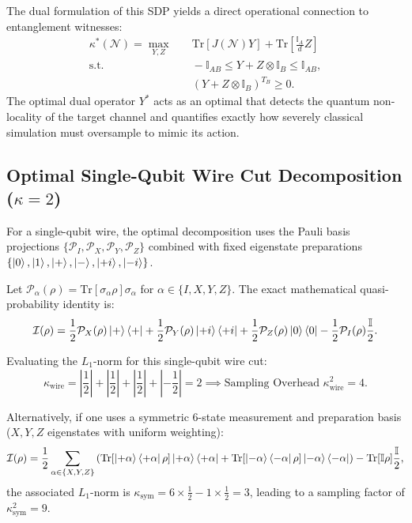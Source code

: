 The dual formulation of this SDP yields a direct operational connection to entanglement witnesses:
\begin{align}
    \kappa^*(\mathcal{N}) = \max_{Y, Z} &\quad \text{Tr}\left[ J(\mathcal{N}) Y \right] + \text{Tr}\left[ \frac{\mathbb{I}_A}{d} Z \right] \nonumber \\
    \text{s.t.} &\quad - \mathbb{I}_{AB} \le Y + Z \otimes \mathbb{I}_B \le \mathbb{I}_{AB}, \nonumber \\
    &\quad (Y + Z \otimes \mathbb{I}_B)^{T_B} \ge 0.
    \label{eq:sdp_dual_channel_cut}
\end{align}
The optimal dual operator $Y^*$ acts as an optimal  that detects the quantum non-locality of the target channel and quantifies exactly how severely classical simulation must oversample to mimic its action.

\subsection{Optimal Single-Qubit Wire Cut Decomposition (\texorpdfstring{$\kappa = 2$}{Kappa = 2})}
For a single-qubit wire, the optimal decomposition uses the Pauli basis projections $\{\mathcal{P}_I, \mathcal{P}_X, \mathcal{P}_Y, \mathcal{P}_Z\}$ combined with fixed eigenstate preparations $\{\ket{0}, \ket{1}, \ket{+}, \ket{-}, \ket{+i}, \ket{-i}\}$. 

Let $\mathcal{P}_\alpha(\rho) = \text{Tr}[\sigma_\alpha \rho] \sigma_\alpha$ for $\alpha \in \{I, X, Y, Z\}$. The exact mathematical quasi-probability identity is:
\begin{equation}
    \mathcal{I}(\rho) = \frac{1}{2} \mathcal{P}_X(\rho) \ket{+}\bra{+} + \frac{1}{2} \mathcal{P}_Y(\rho) \ket{+i}\bra{+i} + \frac{1}{2} \mathcal{P}_Z(\rho) \ket{0}\bra{0} - \frac{1}{2} \mathcal{P}_I(\rho) \frac{\mathbb{I}}{2}.
    \label{eq:pauli_wire_cut_expansion}
\end{equation}

Evaluating the $L_1$-norm for this single-qubit wire cut:
\begin{equation}
    \kappa_{\text{wire}} = \left| \frac{1}{2} \right| + \left| \frac{1}{2} \right| + \left| \frac{1}{2} \right| + \left| -\frac{1}{2} \right| = 2 \implies \text{Sampling Overhead } \kappa_{\text{wire}}^2 = 4.
    \label{eq:kappa_wire_cut_value}
\end{equation}

Alternatively, if one uses a symmetric 6-state measurement and preparation basis ($X, Y, Z$ eigenstates with uniform weighting):
\begin{equation}
    \mathcal{I}(\rho) = \frac{1}{2}\sum_{\alpha \in \{X, Y, Z\}} \left( \text{Tr}[\ket{+\alpha}\bra{+\alpha}\rho]\ket{+\alpha}\bra{+\alpha} + \text{Tr}[\ket{-\alpha}\bra{-\alpha}\rho]\ket{-\alpha}\bra{-\alpha} \right) - \text{Tr}[\mathbb{I}\rho]\frac{\mathbb{I}}{2},
\end{equation}
the associated $L_1$-norm is $\kappa_{\text{sym}} = 6 \times \frac{1}{2} - 1 \times \frac{1}{2} = 3$, leading to a sampling factor of $\kappa_{\text{sym}}^2 = 9$.

